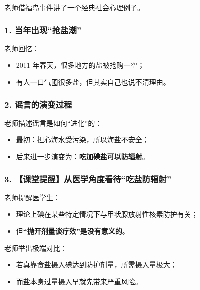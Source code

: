 \documentclass[
  chinese,
  9pt,
  a4paper,
]{ctexart}
\providecommand{\tightlist}{%
  \setlength{\itemsep}{0pt}\setlength{\parskip}{0pt}}
\begin{document}
老师借福岛事件讲了一个经典社会心理例子。

\subsubsection{1.
当年出现``抢盐潮''}\label{ux5f53ux5e74ux51faux73b0ux62a2ux76d0ux6f6e}

老师回忆：

\begin{itemize}
\tightlist
\item
  2011 年春天，很多地方的盐被抢购一空；
\item
  有人一口气囤很多盐，但其实自己也说不清理由。
\end{itemize}

\subsubsection{2.
谣言的演变过程}\label{ux8c23ux8a00ux7684ux6f14ux53d8ux8fc7ux7a0b}

老师描述谣言是如何``进化''的：

\begin{itemize}
\tightlist
\item
  最初：担心海水受污染，所以海盐不安全；
\item
  后来进一步演变为：\textbf{吃加碘盐可以防辐射}。
\end{itemize}

\subsubsection{3.
【课堂提醒】从医学角度看待``吃盐防辐射''}\label{ux8bfeux5802ux63d0ux9192ux4eceux533bux5b66ux89d2ux5ea6ux770bux5f85ux5403ux76d0ux9632ux8f90ux5c04}

老师提醒医学生：

\begin{itemize}
\tightlist
\item
  理论上碘在某些特定情况下与甲状腺放射性核素防护有关；
\item
  但\textbf{``抛开剂量谈疗效''是没有意义的}。
\end{itemize}

老师举出极端对比：

\begin{itemize}
\tightlist
\item
  若真靠食盐摄入碘达到防护剂量，所需摄入量极大；
\item
  而盐本身过量摄入早就先带来严重风险。
\end{itemize}
\end{document}
